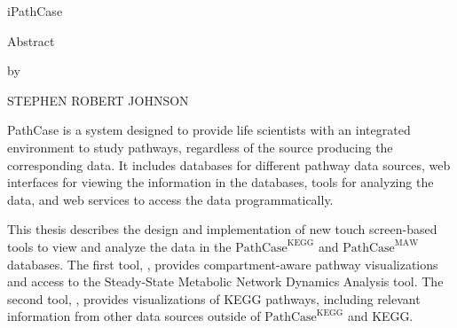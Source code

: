 \newcommand{\pathcasekegg}{ $\mathrm{PathCase}^\mathrm{KEGG}$ }
\newcommand{\pathcasemaw}{ $\mathrm{PathCase}^\mathrm{MAW}$ }
\newcommand{\pathcasesb}{ $\mathrm{PathCase}^\mathrm{SB}$ }

\begin{center}
    iPathCase

    Abstract

    by

    STEPHEN ROBERT JOHNSON
\end{center}

PathCase is a system designed to provide life scientists with an integrated
environment to study pathways, regardless of the source producing the
corresponding data. It includes databases for different pathway data sources,
web interfaces for viewing the information in the databases, tools for analyzing
the data, and web services to access the data programmatically.

This thesis describes the design and implementation of new touch screen-based
tools to view and analyze the data in the \pathcasekegg and \pathcasemaw
databases. The first tool, \mawapp, provides compartment-aware pathway
visualizations and access to the Steady-State Metabolic Network Dynamics
Analysis tool. The second tool, \keggapp, provides visualizations of KEGG
pathways, including relevant information from other data sources outside of
\pathcasekegg and KEGG.

